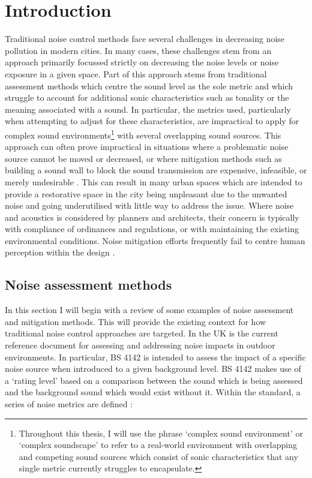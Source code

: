 
\section{Introduction}

Traditional noise control methods face several challenges in decreasing noise pollution in modern cities. In many cases, these challenges stem from an approach primarily focussed strictly on decreasing the noise levels or noise exposure in a given space. Part of this approach stems from traditional assessment methods which centre the sound level as the sole metric and which struggle to account for additional sonic characteristics such as tonality or the meaning associated with a sound. In particular, the metrics used, particularly when attempting to adjust for these characteristics, are impractical to apply for complex sound environments\footnote{Throughout this thesis, I will use the phrase `complex sound environment' or `complex soundscape' to refer to a real-world environment with overlapping and competing sound sources which consist of sonic characteristics that any single metric currently struggles to encapsulate.} with several overlapping sound sources. This approach can often prove impractical in situations where a problematic noise source cannot be moved or decreased, or where mitigation methods such as building a sound wall to block the sound transmission are expensive, infeasible, or merely undesirable . This can result in many urban spaces which are intended to provide a restorative space in the city being unpleasant due to the unwanted noise and going underutilised with little way to address the issue. Where noise and acoustics is considered by planners and architects, their concern is typically with compliance of ordinances and regulations, or with maintaining the existing environmental conditions. Noise mitigation efforts frequently fail to centre human perception within the design . 

\subsection{Noise assessment methods}
In this section I will begin with a review of some examples of noise assessment and mitigation methods. This will provide the existing context for how traditional noise control approaches are targeted. In the UK \citet{BS41422019} is the current reference document for assessing and addressing noise impacts in outdoor environments. In particular, BS 4142 is intended to assess the impact of a specific noise source when introduced to a given background level. BS 4142 makes use of a `rating level' based on a comparison between the sound which is being assessed and the background sound which would exist without it. Within the standard, a series of noise metrics are defined \citep[Sec. 3]{BS41422019}:


